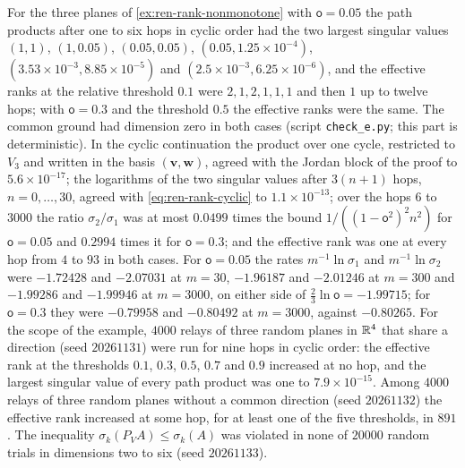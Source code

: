 \begin{numcheck}\label{chk:ren-rank-nonmonotone}
For the three planes of \cref{ex:ren-rank-nonmonotone} with $\mathsf o=0.05$ the path products after one to six hops in cyclic order had the two largest singular values $(1,1)$, $(1,0.05)$, $(0.05,0.05)$, $(0.05,1.25\times10^{-4})$, $(3.53\times10^{-3},8.85\times10^{-5})$ and $(2.5\times10^{-3},6.25\times10^{-6})$, and the effective ranks at the relative threshold $0.1$ were $2,1,2,1,1,1$ and then $1$ up to twelve hops; with $\mathsf o=0.3$ and the threshold $0.5$ the effective ranks were the same. The common ground had dimension zero in both cases (script \texttt{check\_e.py}; this part is deterministic). In the cyclic continuation the product over one cycle, restricted to $V_3$ and written in the basis $(\mathbf v,\mathbf w)$, agreed with the Jordan block of the proof to $5.6\times10^{-17}$; the logarithms of the two singular values after $3(n+1)$ hops, $n=0,\dots,30$, agreed with \eqref{eq:ren-rank-cyclic} to $1.1\times10^{-13}$; over the hops $6$ to $3000$ the ratio $\sigma_2/\sigma_1$ was at most $0.0499$ times the bound $1/((1-\mathsf o^2)^2n^2)$ for $\mathsf o=0.05$ and $0.2994$ times it for $\mathsf o=0.3$; and the effective rank was one at every hop from $4$ to $93$ in both cases. For $\mathsf o=0.05$ the rates $m^{-1}\ln\sigma_1$ and $m^{-1}\ln\sigma_2$ were $-1.72428$ and $-2.07031$ at $m=30$, $-1.96187$ and $-2.01246$ at $m=300$ and $-1.99286$ and $-1.99946$ at $m=3000$, on either side of $\frac23\ln\mathsf o=-1.99715$; for $\mathsf o=0.3$ they were $-0.79958$ and $-0.80492$ at $m=3000$, against $-0.80265$. For the scope of the example, $4000$ relays of three random planes in $\mathbb{R}^4$ that share a direction (seed $20261131$) were run for nine hops in cyclic order: the effective rank at the thresholds $0.1$, $0.3$, $0.5$, $0.7$ and $0.9$ increased at no hop, and the largest singular value of every path product was one to $7.9\times10^{-15}$. Among $4000$ relays of three random planes without a common direction (seed $20261132$) the effective rank increased at some hop, for at least one of the five thresholds, in $891$. The inequality $\sigma_k(P_VA)\le\sigma_k(A)$ was violated in none of $20000$ random trials in dimensions two to six (seed $20261133$).
\end{numcheck}


